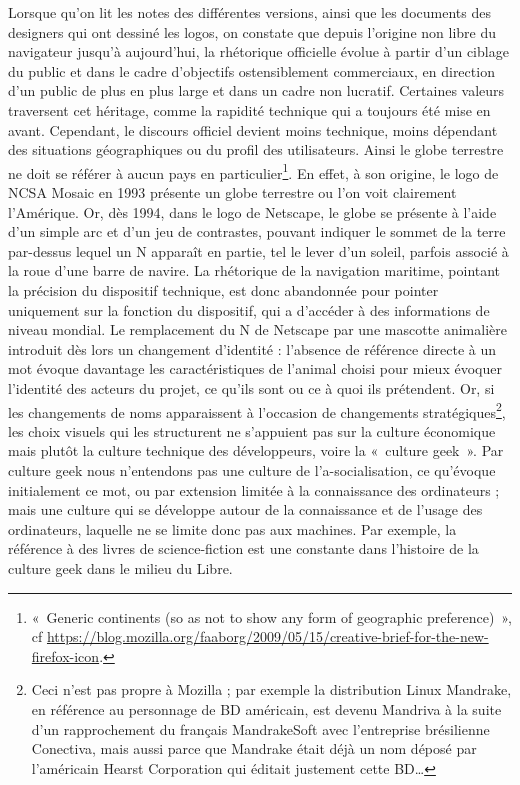 \documentclass{FramateX}
\begin{document}
\begin{refsection}
Lorsque qu'on lit les notes des différentes versions,
ainsi que les documents des designers qui ont dessiné les logos, on constate que depuis l'origine non libre du navigateur
jusqu'à aujourd'hui, la rhétorique officielle évolue à partir d'un
ciblage du public et dans le cadre d'objectifs ostensiblement
commerciaux, en direction d'un public de plus en plus large et dans un
cadre non lucratif. Certaines valeurs traversent cet héritage, comme la
rapidité technique qui a toujours été mise en avant. Cependant, le
discours officiel devient moins technique, moins dépendant des
situations géographiques ou du profil des utilisateurs. Ainsi le globe
terrestre ne doit se référer à aucun pays en particulier\footnote{«~Generic continents (so as not to show any form of geographic preference)~», cf \url{https://blog.mozilla.org/faaborg/2009/05/15/creative-brief-for-the-new-firefox-icon}.}. En effet, à son origine, le logo de NCSA Mosaic en 1993 présente un
globe terrestre ou l'on voit clairement l'Amérique. Or, dès 1994, dans
le logo de Netscape, le globe se présente à l'aide d'un simple arc et
d'un jeu de contrastes, pouvant indiquer le sommet de la terre
par-dessus lequel un N apparaît en partie, tel le lever d'un soleil,
parfois associé à la roue d'une barre de navire. La rhétorique de la
navigation maritime, pointant la précision du dispositif technique, est
donc abandonnée pour pointer uniquement sur la fonction du dispositif,
qui a d'accéder à des informations de niveau mondial. Le remplacement
du N de Netscape par une mascotte animalière introduit dès lors un
changement d'identité : l'absence de référence directe à un mot évoque
davantage les caractéristiques de l'animal choisi pour mieux évoquer
l'identité des acteurs du projet, ce qu'ils sont ou ce à quoi ils
prétendent. Or, si les changements de noms apparaissent à l'occasion de
changements stratégiques\footnote{Ceci n'est pas
propre à Mozilla ; par exemple la distribution Linux Mandrake, en
référence au personnage de BD américain, est devenu Mandriva à la suite
d'un rapprochement du français MandrakeSoft avec l'entreprise
brésilienne Conectiva, mais aussi parce que Mandrake était déjà un nom
déposé par l'américain Hearst Corporation qui éditait justement cette
BD\ldots}, les choix visuels qui les structurent ne s'appuient pas sur la
culture économique mais plutôt la culture technique des développeurs,
voire la «~culture geek~». Par culture geek nous n'entendons pas une
culture de l'a-socialisation, ce qu'évoque initialement ce mot, ou par
extension limitée à la connaissance des ordinateurs ; mais une culture
qui se développe autour de la connaissance et de l'usage des
ordinateurs, laquelle ne se limite donc pas aux machines. Par exemple,
la référence à des livres de science-fiction est une constante dans
l'histoire de la culture geek dans le milieu du Libre. 


\end{refsection}
\end{document}

